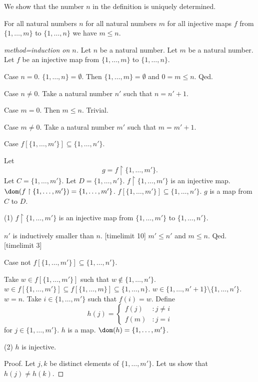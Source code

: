 \documentclass{article}
\newcommand{\Seq}[2]{\{#1,\dots,#2\}}
\begin{document}
  We show that the number $n$ in the definition is uniquely
  determined.
  \begin{forthel}

  \begin{lemma}
  For all natural numbers $n$
  for all natural numbers $m$
  for all injective maps $f$ from
  $\Seq{1}{m}$ to $\Seq{1}{n}$ we have $m \leq n$.
  \end{lemma}
  \begin{proof}[method=induction on $n$]
  Let $n$ be a natural number.
  Let $m$ be a natural number.
  Let $f$ be an injective map from $\Seq{1}{m}$ to $\Seq{1}{n}$.

  Case $n=0$. $\Seq{1}{n} = \emptyset$. Then $\Seq{1}{m} = \emptyset$ and
  $0 = m \leq n$. Qed.

  Case $n \neq 0$.
  Take a natural number $n'$ such that $n = n' + 1$.

  Case $m = 0$. Then $m \leq n$. Trivial.

  Case $m \neq 0$.
  Take a natural number $m'$ such that $m = m' + 1$.

  Case $f[\Seq{1}{m'}] \subseteq \Seq{1}{n'}$.

  Let
$$g = f \upharpoonright \Seq{1}{m'}.$$
  Let $C = \Seq{1}{m'}$. Let $D = \Seq{1}{n'}$.
  $f \upharpoonright \Seq{1}{m'}$ is an injective map.
  $\dom(f \upharpoonright \Seq{1}{m'}) = \Seq{1}{m'}$.
  $f[\Seq{1}{m'}] \subseteq \Seq{1}{n'}$.
  $g$ is a map
  from $C$ to $D$.

  (1) $f \upharpoonright \Seq{1}{m'}$ is an injective map
  from $\Seq{1}{m'}$ to $\Seq{1}{n'}$.

  $n'$ is inductively smaller than $n$.
[timelimit 10] %
  $m' \leq n'$ and $m \leq n$. Qed.
[timelimit 3] %

  Case not $f[\Seq{1}{m'}] \subseteq \Seq{1}{n'}$.

  Take $w \in f[\Seq{1}{m'}]$ such that $w \notin \Seq{1}{n'}$.
  $w \in f[\Seq{1}{m'}] \subseteq f[\Seq{1}{m}] \subseteq \Seq{1}{n}$.
  $w \in \Seq{1}{n'+1} \setminus \Seq{1}{n'}$.
  $w = n$.
  Take $i \in \Seq{1}{m'}$ such that $f(i) = w$.
  Define
  \[h(j) =
    \begin{cases}
    f(j)  & : j \neq i \\
    f(m) & : j = i
    \end{cases} \]
  for $j \in \Seq{1}{m'}$.
  $h$ is a map. $\dom(h) = \Seq{1}{m'}$.

  (2) $h$ is injective.

  Proof.
  Let $j,k$ be distinct elements of $\Seq{1}{m'}$.
  Let us show that $h(j) \neq h(k)$.


\end{proof}
\end{forthel}
\end{document}
